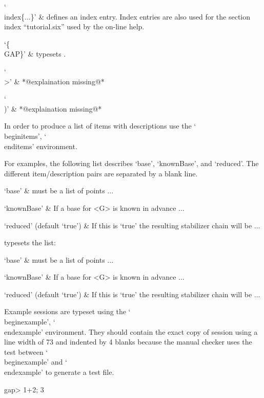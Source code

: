 `\\index\{...\}' &
    defines an index entry.  Index entries are  also used for the section
    index ``tutorial.six'' used by the on-line help.

`\{\\GAP\}' &
    typesets {\GAP}.

`\\>' &
    *@explaination missing@*

`\\)' &
    *@explaination missing@*

\enditems


In order  to   produce  a  list   of  items with   descriptions  use  the
`\\beginitems', `\\enditems' environment.

For examples, the   following  list describes   `base', `knownBase',  and
`reduced'.  The different item/description pairs are separated by a blank
line.

\begintt
  \beginitems
    `base' &
        must be a  list of points ...

    `knownBase' &
        If a base for <G> is known in advance ...

    `reduced' (default `true') &
        If this is `true' the resulting stabilizer chain will be ...
  \enditems
\endtt

typesets the list:

\beginitems
  `base' &
      must be a  list of points ...

  `knownBase' &
      If a base for <G> is known in advance ...

  `reduced' (default `true') &
      If this is `true' the resulting stabilizer chain will be ...
\enditems

Example   {\GAP}  sessions  are    typeset  using the   `\\beginexample',
`\\endexample' environment.   They  should contain   the   exact  copy of
{\GAP} session using a line width of 73 and  indented by 4 blanks because
the   manual  checker  uses    the  test  between   `\\beginexample'  and
`\\endexample' to generate a test file.

\begintt
  \beginexample
      gap> 1+2;
      3
  \endexample
\endtt

